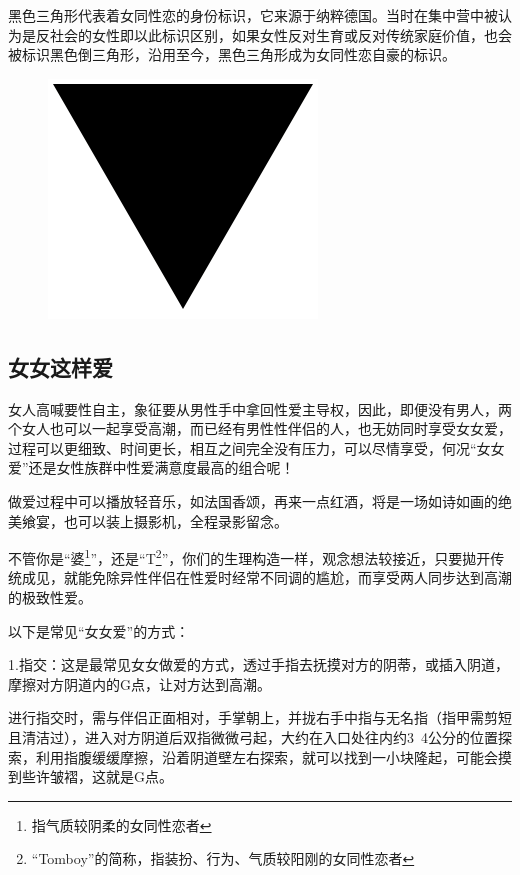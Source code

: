 \documentclass[12pt,UTF8]{ctexbook}
\begin{document}
黑色三角形代表着女同性恋的身份标识，它来源于纳粹德国。当时在集中营中被认为是反社会的女性即以此标识区别，如果女性反对生育或反对传统家庭价值，也会被标识黑色倒三角形，沿用至今，黑色三角形成为女同性恋自豪的标识。

\begin{figure}[H]
	\centering
	\includegraphics[width=0.7\linewidth]{9}
	\caption{}
	\label{fig:1}
\end{figure}

\subsection{女女这样爱}

女人高喊要性自主，象征要从男性手中拿回性爱主导权，因此，即便没有男人，两个女人也可以一起享受高潮，而已经有男性性伴侣的人，也无妨同时享受女女爱，过程可以更细致、时间更长，相互之间完全没有压力，可以尽情享受，何况“女女爱”还是女性族群中性爱满意度最高的组合呢！

做爱过程中可以播放轻音乐，如法国香颂，再来一点红酒，将是一场如诗如画的绝美飨宴，也可以装上摄影机，全程录影留念。

不管你是“婆\footnote{指气质较阴柔的女同性恋者}”，还是“T\footnote{“Tomboy”的简称，指装扮、行为、气质较阳刚的女同性恋者}”，你们的生理构造一样，观念想法较接近，只要拋开传统成见，就能免除异性伴侣在性爱时经常不同调的尴尬，而享受两人同步达到高潮的极致性爱。

以下是常见“女女爱”的方式：

1.指交：这是最常见女女做爱的方式，透过手指去抚摸对方的阴蒂，或插入阴道，摩擦对方阴道内的G点，让对方达到高潮。

进行指交时，需与伴侣正面相对，手掌朝上，并拢右手中指与无名指（指甲需剪短且清洁过），进入对方阴道后双指微微弓起，大约在入口处往内约3~4公分的位置探索，利用指腹缓缓摩擦，沿着阴道壁左右探索，就可以找到一小块隆起，可能会摸到些许皱褶，这就是G点。
\end{document}
